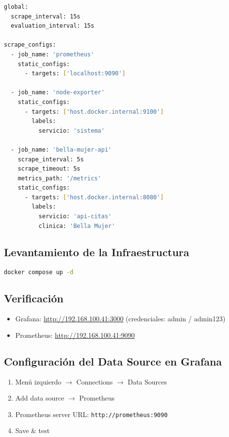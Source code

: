 \documentclass[12pt, a4paper]{article}
\begin{document}
\begin{lstlisting}[language=bash, caption={prometheus.yml}, label={lst:prometheus}]
global:
  scrape_interval: 15s
  evaluation_interval: 15s

scrape_configs:
  - job_name: 'prometheus'
    static_configs:
      - targets: ['localhost:9090']

  - job_name: 'node-exporter'
    static_configs:
      - targets: ['host.docker.internal:9100']
        labels:
          servicio: 'sistema'

  - job_name: 'bella-mujer-api'
    scrape_interval: 5s
    scrape_timeout: 5s
    metrics_path: '/metrics'
    static_configs:
      - targets: ['host.docker.internal:8080']
        labels:
          servicio: 'api-citas'
          clinica: 'Bella Mujer'
\end{lstlisting}

\subsection{Levantamiento de la Infraestructura}

\begin{lstlisting}[language=bash, caption={Levantamiento de contenedores}]
docker compose up -d
\end{lstlisting}

\subsection{Verificación}

\begin{itemize}
    \item Grafana: \url{http://192.168.100.41:3000} (credenciales: admin / admin123)
    \item Prometheus: \url{http://192.168.100.41:9090}
\end{itemize}

\subsection{Configuración del Data Source en Grafana}

\begin{enumerate}
    \item Menú izquierdo $\rightarrow$ Connections $\rightarrow$ Data Sources
    \item Add data source $\rightarrow$ Prometheus
    \item Prometheus server URL: \texttt{http://prometheus:9090}
    \item Save \& test
\end{enumerate}
\end{document}
